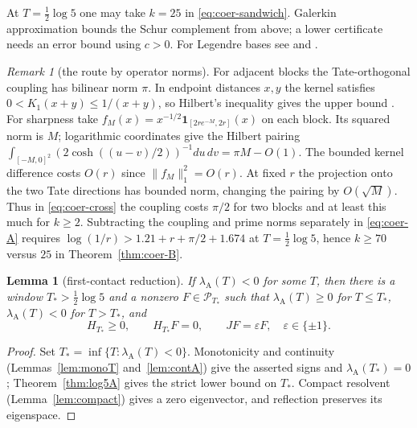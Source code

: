 \documentclass[10pt]{amsart}
\newtheorem{lemma}[theorem]{Lemma}
\theoremstyle{definition}
\theoremstyle{remark}
\newtheorem{remark}[theorem]{Remark}
\newcommand{\lamA}{\lambda_{\mathrm A}(T)}
\begin{document}
At $T=\tfrac12\log5$ one may take $k=25$ in \eqref{eq:coer-sandwich}.
Galerkin approximation bounds the Schur complement from above; a lower
certificate needs an error bound using $c>0$. For Legendre bases see
\cite[Thms.~1.1, 1.4]{Zhu2026} and \cite{Groskin2026}.

\begin{remark}[the route by operator norms]\label{rem:coer-nogo}
For adjacent blocks the Tate-orthogonal coupling has bilinear norm
$\pi$. In endpoint distances $x,y$ the kernel satisfies
$0<K_1(x+y)\le1/(x+y)$, so Hilbert's inequality gives the upper
bound \cite[Thm.~316]{HLP}. For sharpness take
$f_M(x)=x^{-1/2}\mathbf1_{[2re^{-M},2r]}(x)$ on each block.
Its squared norm is $M$; logarithmic coordinates give the Hilbert
pairing $\int_{[-M,0]^2}(2\cosh((u-v)/2))^{-1}du\,dv=\pi M-O(1)$.
The bounded kernel difference costs $O(r)$ since $\|f_M\|_1^2=O(r)$.
At fixed $r$ the projection onto the two Tate directions has bounded
norm, changing the pairing by $O(\sqrt M)$. Thus in
\eqref{eq:coer-cross} the coupling costs $\pi/2$ for two blocks
and at least this much for $k\ge2$. Subtracting the coupling and
prime norms separately in \eqref{eq:coer-A} requires
$\log(1/r)>1.21+r+\pi/2+1.674$ at $T=\tfrac12\log5$, hence
$k\ge70$ versus $25$ in Theorem~\ref{thm:coer-B}.
\end{remark}


\begin{lemma}[first-contact reduction]\label{lem:firstcontact}
If $\lamA<0$ for some $T$, then there is a window $T_*>\frac12\log5$ and a nonzero $F\in\mathcal P_{T_*}$ such
that $\lambda_{\mathrm A}(T)\ge0$ for $T\le T_*$, $\lambda_{\mathrm A}(T)<0$ for $T>T_*$, and
\[
 H_{T_*}\ge0,\qquad H_{T_*}F=0,\qquad JF=\varepsilon F,\quad \varepsilon\in\{\pm1\}.
\]
\end{lemma}
\begin{proof}
Set $T_*=\inf\{T:\lamA<0\}$. Monotonicity and continuity
(Lemmas~\ref{lem:monoT} and~\ref{lem:contA}) give the asserted signs
and $\lambda_{\mathrm A}(T_*)=0$; Theorem~\ref{thm:log5A} gives the
strict lower bound on $T_*$. Compact resolvent (Lemma~\ref{lem:compact})
gives a zero eigenvector, and reflection preserves its eigenspace.
\end{proof}
\end{document}
